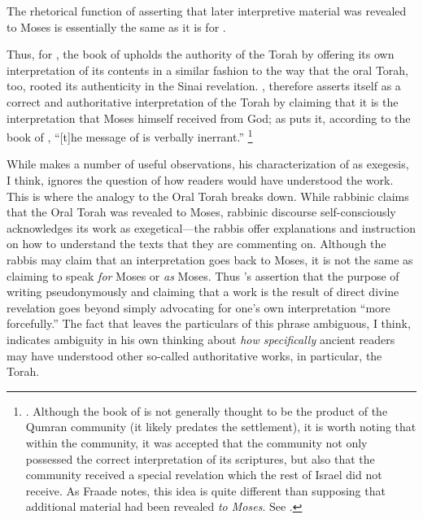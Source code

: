 \noindent
The rhetorical function of asserting that later interpretive material was revealed to Moses is essentially the same as it is for \jub.

Thus, for \vanderkam, the book of \jub upholds the authority of the Torah by offering its own interpretation of its contents in a similar fashion to the way that the oral Torah, too, rooted its authenticity in the Sinai revelation. \jub, therefore asserts itself as a correct and authoritative interpretation of the Torah by claiming that it is the interpretation that Moses himself received from God; as \vanderkam puts it, according to the book of \jub, ``[t]he message of \jub is verbally inerrant.''%
    \footnote{
        \cite[33]{vanderkam_metso-etal2010}.
        Although the book of \jub is not generally thought to be the product of the Qumran community (it likely predates the settlement), it is worth noting that within the community, it was accepted that the community not only possessed the correct interpretation of its scriptures, but also that the community received a special revelation which the rest of Israel did not receive. As Fraade notes, this idea is quite different than supposing that additional material had been revealed \emph{to Moses}. See 
        \cite[67]{fraade_jjs1993}.}

While \vanderkam makes a number of useful observations, his characterization of \jub as exegesis, I think, ignores the question of how readers would have understood the work. This is where the analogy to the Oral Torah breaks down. While rabbinic claims that the Oral Torah was revealed to Moses, rabbinic discourse self-consciously acknowledges its work as exegetical---the rabbis offer explanations and instruction on how to understand the texts that they are commenting on. Although the rabbis may claim that an interpretation goes back to Moses, it is not the same as claiming to speak \emph{for} Moses or \emph{as} Moses. Thus \vanderkam's assertion that the purpose of writing pseudonymously and claiming that a work is the result of direct divine revelation goes beyond simply advocating for one's own interpretation ``more forcefully.'' The fact that \vanderkam leaves the particulars of this phrase ambiguous, I think, indicates ambiguity in his own thinking about \emph{how specifically} ancient readers may have understood \jub \visavis other so-called authoritative works, in particular, the Torah.

